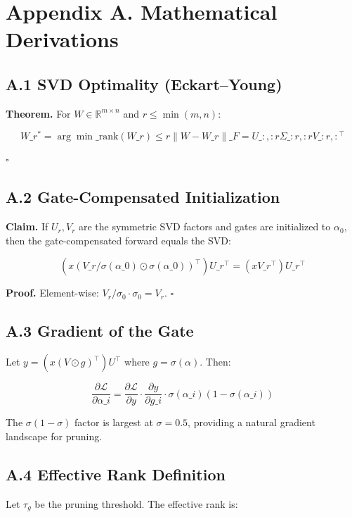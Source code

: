 
\section{Appendix A. Mathematical Derivations}

\subsection{A.1 SVD Optimality (Eckart--Young)}

\textbf{Theorem.} For $W \in \mathbb{R}^{m \times n}$ and $r \leq \min(m, n)$:

\[
W\_r^* = \arg\min\_{\text{rank}(W\_r) \leq r} \|W - W\_r\|\_F = U\_{:, :r} \Sigma\_{:r, :r} V\_{:r, :}^\top
\tag{A.1}
\]

$\square$

\subsection{A.2 Gate-Compensated Initialization}

\textbf{Claim.} If $U_r, V_r$ are the symmetric SVD factors and gates are 
initialized to $\alpha_0$, then the gate-compensated forward equals the SVD:

\[
(x (V\_r / \sigma(\alpha\_0) \odot \sigma(\alpha\_0))^\top) U\_r^\top = (x V\_r^\top) U\_r^\top
\tag{A.2}
\]

\textbf{Proof.} Element-wise: $V_r / \sigma_0 \cdot \sigma_0 = V_r$. $\square$

\subsection{A.3 Gradient of the Gate}

Let $y = (x (V \odot g)^\top) U^\top$ where $g = \sigma(\alpha)$. Then:

\[
\frac{\partial \mathcal{L}}{\partial \alpha\_i}
= \frac{\partial \mathcal{L}}{\partial y} \cdot \frac{\partial y}{\partial g\_i} \cdot \sigma(\alpha\_i)(1 - \sigma(\alpha\_i))
\tag{A.3}
\]

The $\sigma(1-\sigma)$ factor is largest at $\sigma = 0.5$, providing a 
natural gradient landscape for pruning.

\subsection{A.4 Effective Rank Definition}

Let $\tau_g$ be the pruning threshold. The effective rank is:


